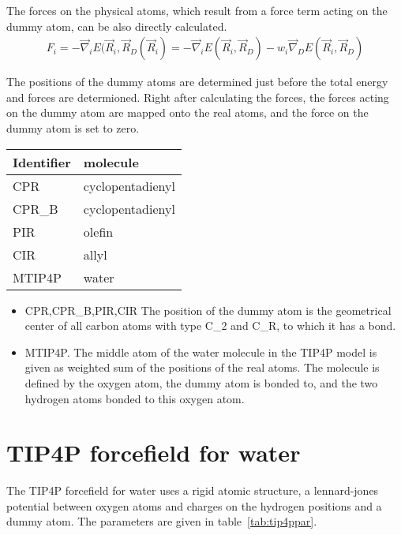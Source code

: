 \documentclass[11pt,a4paper]{report}
\begin{document}
The forces on the physical atoms, which result from a force term
acting on the dummy atom, can be also directly calculated.
\begin{eqnarray}
F_i=-\vec{\nabla}_iE(\vec{R}_i,\vec{R}_D(\vec{R}_i)=
-\vec{\nabla}_iE(\vec{R}_i,\vec{R}_D)
-w_i\vec{\nabla}_DE(\vec{R}_i,\vec{R}_D)
\end{eqnarray}

The positions of the dummy atoms are determined just before the total
energy and forces are determioned. Right after calculating the forces,
the forces acting on the dummy atom are mapped onto the real atoms,
and the force on the dummy atom is set to zero.






\begin{tabular}{|l|l|}
\hline
\hline
Identifier & molecule \\
\hline
CPR   & cyclopentadienyl\\
CPR\_B & cyclopentadienyl\\
PIR    & olefin\\
CIR    & allyl\\
MTIP4P & water\\
\hline
\end{tabular}


\begin{itemize}
\item CPR,CPR\_B,PIR,CIR The position of the dummy atom is the
  geometrical center of all carbon atoms with type C\_2 and C\_R, to
  which it has a bond.
%
\item MTIP4P. The middle atom of the water molecule in the TIP4P model
  is given as weighted sum of the positions of the real atoms. The
  molecule is defined by the oxygen atom, the dummy atom is bonded to,
  and the two hydrogen atoms bonded to this oxygen atom.
\end{itemize}


\section{TIP4P forcefield for water}
The TIP4P forcefield\cite{jorgensen83_jcp79_926} for water uses a
rigid atomic structure, a lennard-jones potential between oxygen atoms
and charges on the hydrogen positions and a dummy atom. The parameters
are given in table~\ref{tab:tip4ppar}.
\end{document}
